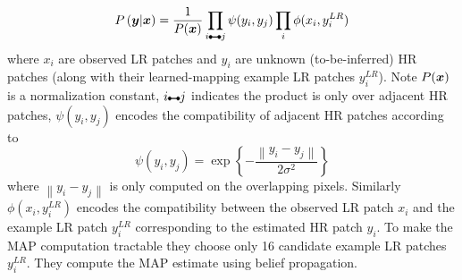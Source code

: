 \begin{equation}
	P\left( \by \middle| \bx \right) = \frac{1}{P(\bx)} \prod_{i\ue{} j} \psi(y_i, y_j) \prod_i \phi(x_i, y_i^{LR})
\end{equation}
where $x_i$ are observed LR patches and $y_i$ are unknown (to-be-inferred) HR patches (along with their learned-mapping example LR patches $y_i^{LR}$).
%
Note $P(\bm{x})$ is a normalization constant, $i\ue{} j$ indicates the product is only over adjacent HR patches, $\psi(y_i, y_j)$ encodes the compatibility of adjacent HR patches according to
\begin{equation}
	\psi(y_i, y_j) = \exp \left\{ -  \frac{\left\| y_i - y_j \right\|}{2\sigma^2} \right\}
\end{equation}
where $\left\| y_i - y_j \right\|$ is only computed on the overlapping pixels.
%
Similarly $\phi(x_i, y_i^{LR})$ encodes the compatibility between the observed LR patch $x_i$ and the example LR patch $y_i^{LR}$ corresponding to the estimated HR patch $y_i$.
%
To make the MAP computation tractable they choose only 16 candidate example LR patches $y_i^{LR}$.
%
They compute the MAP estimate using belief propagation.
